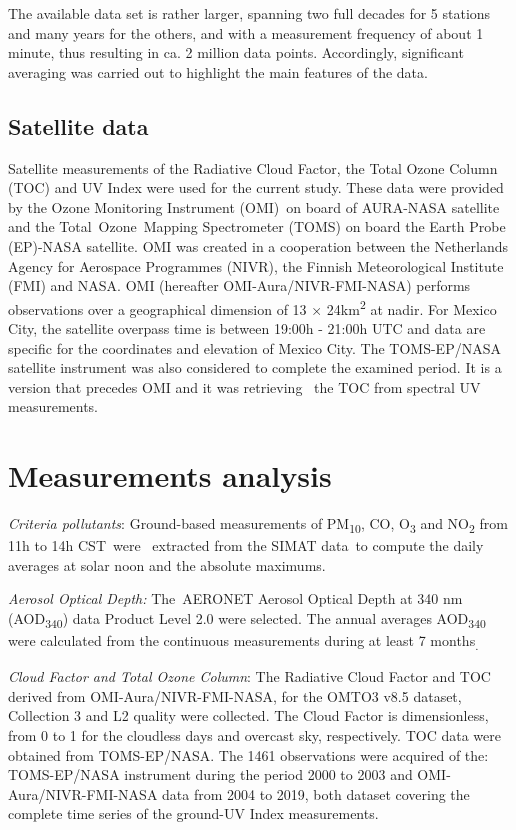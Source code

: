 \documentclass{article}
\begin{document}
The available data set is rather larger, spanning two full decades for 5
stations and many years for the others, and with a measurement frequency
of about 1 minute, thus resulting in ca. 2 million data points.
Accordingly, significant averaging was carried out to highlight the main
features of the data.

\subsection*{Satellite data}

Satellite measurements of the Radiative Cloud Factor, the Total Ozone
Column (TOC) and UV Index were used for the current study. These data
were provided by the Ozone Monitoring Instrument (OMI)~on board of
AURA-NASA satellite and the Total~Ozone~Mapping Spectrometer (TOMS) on
board the Earth Probe (EP)-NASA satellite. OMI was created in a
cooperation between the Netherlands Agency for Aerospace Programmes
(NIVR), the Finnish Meteorological Institute (FMI) and NASA. OMI
(hereafter OMI-Aura/NIVR-FMI-NASA) performs observations over a
geographical dimension of 13 × 24km\textsuperscript{2} at nadir. For
Mexico City, the satellite overpass time is between 19:00h - 21:00h UTC
and data are specific for the coordinates and elevation of Mexico City.
The TOMS-EP/NASA satellite instrument was also considered to complete
the examined period. It is a version that precedes OMI and it was
retrieving~ the TOC from spectral UV measurements. ~

\section*{Measurements analysis}


\emph{Criteria pollutants}{: Ground-based measurements of
PM}\textsubscript{10}{, CO, O}\textsubscript{3}{ and
NO}\textsubscript{2}{ from 11h to 14h CST~were~} extracted from the
SIMAT data{~to compute the daily averages at solar noon and the absolute
maximums.}

\emph{Aerosol Optical Depth:} The~AERONET Aerosol Optical Depth at 340
nm (AOD\textsubscript{340}) data Product Level 2.0 were selected. The
annual averages AOD\textsubscript{340} were calculated from the
continuous measurements during at least 7 months\textsubscript{.}

\emph{Cloud Factor and Total Ozone Column}: The Radiative Cloud Factor
and TOC derived from OMI-Aura/NIVR-FMI-NASA, for the OMTO3 v8.5 dataset,
Collection 3 and L2 quality were collected. The Cloud Factor is
dimensionless, from 0 to 1 for the cloudless days and overcast sky,
respectively. TOC data were obtained from TOMS-EP/NASA. The 1461
observations were acquired of the: TOMS-EP/NASA instrument during the
period 2000 to 2003 and OMI-Aura/NIVR-FMI-NASA data from 2004 to 2019,
both dataset covering the complete time series of the ground-UV Index
measurements.
\end{document}
